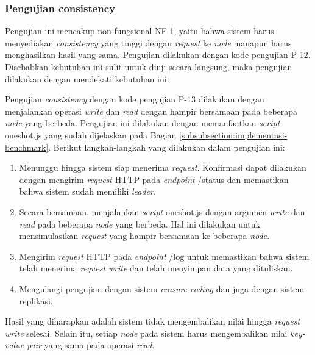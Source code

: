 \subsubsection{Pengujian consistency}
\label{subsubsection:pengujian-consistency}

Pengujian ini mencakup non-fungsional NF-1, yaitu bahwa sistem harus menyediakan \textit{consistency} yang tinggi dengan \textit{request} ke \textit{node} manapun harus menghasilkan hasil yang sama. Pengujian dilakukan dengan kode pengujian P-12. Disebabkan kebutuhan ini sulit untuk diuji secara langsung, maka pengujian dilakukan dengan mendekati kebutuhan ini. 


Pengujian \textit{consistency} dengan kode pengujian P-13 dilakukan dengan menjalankan operasi \textit{write} dan \textit{read} dengan hampir bersamaan pada beberapa \textit{node} yang berbeda. Pengujian ini dilakukan dengan memanfaatkan \textit{script} oneshot.js yang sudah dijelaskan pada Bagian \ref{subsubsection:implementasi-benchmark}. Berikut langkah-langkah yang dilakukan dalam pengujian ini:

\begin{enumerate}
    \item Menunggu hingga sistem siap menerima \textit{request}. Konfirmasi dapat dilakukan dengan mengirim \textit{request} HTTP pada \textit{endpoint} /status dan memastikan bahwa sistem sudah memiliki \textit{leader}.
    \item Secara bersamaan, menjalankan \textit{script} oneshot.js dengan argumen \textit{write} dan \textit{read} pada beberapa \textit{node} yang berbeda. Hal ini dilakukan untuk mensimulasikan \textit{request} yang hampir bersamaan ke beberapa \textit{node}.
    \item Mengirim \textit{request} HTTP pada \textit{endpoint} /log untuk memastikan bahwa sistem telah menerima \textit{request} \textit{write} dan telah menyimpan data yang dituliskan.
    \item Mengulangi pengujian dengan sistem \textit{erasure coding} dan juga dengan sistem replikasi.
\end{enumerate}

Hasil yang diharapkan adalah sistem tidak mengembalikan nilai hingga \textit{request} \textit{write} selesai. Selain itu, setiap \textit{node} pada sistem harus mengembalikan nilai \textit{key-value pair} yang sama pada operasi \textit{read}.
